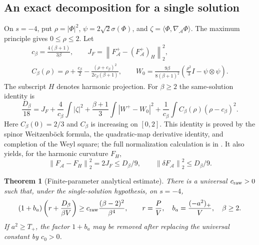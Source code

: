 \documentclass[11pt,a4paper]{article}
\newtheorem{theorem}{Theorem}[section]
\theoremstyle{definition}
\theoremstyle{remark}
\newcommand{\Acal}{\mathcal A}
\newcommand{\norm}[1]{\left\lVert#1\right\rVert}
\begin{document}
\subsection{An exact decomposition for a single solution}
On $s=-4$, put $\rho=|\Phi|^2$, $\psi=2\sqrt2\sigma(\Phi)$, and $\zeta=\langle\Phi,\nabla_{\Acal}\Phi\rangle$. The maximum principle gives $0\le\rho\le2$. Let
\begin{gather}
 c_\beta=\frac{4(\beta+1)}{3\beta},\qquad
 J_F=\norm{F^+_{\Acal}-(F^+_{\Acal})_H}_2^2,\nonumber\\
 C_\beta(\rho)=\rho+\frac{c_\beta}{2}
 -\frac{(\rho+c_\beta)^2}{2c_\beta(\beta+1)},\qquad
 W_0=\frac{9\beta}{8(\beta+1)^2}
       \left(\frac{\rho^2}{3}I-\psi\otimes\psi\right).
 \label{eq:calibration}
\end{gather}
The subscript $H$ denotes harmonic projection. For $\beta\ge2$ the same-solution identity is
\begin{equation}
 \frac{D_\beta}{18}=J_F+\frac4{c_\beta}\int|\zeta|^2
 +\frac{\beta+1}{3}\int|W^+-W_0|^2
 +\frac1{c_\beta}\int C_\beta(\rho)(\rho-c_\beta)^2.
 \label{eq:decomposition}
\end{equation}
Here $C_\beta(0)=2/3$ and $C_\beta$ is increasing on $[0,2]$. This identity is proved by the spinor Weitzenb\"ock formula, the quadratic-map derivative identity, and completion of the Weyl square; the full normalization calculation is in \cite[Section 2]{Parameter}. It also yields, for the harmonic curvature $F_H$,
\begin{equation}
 \norm{F_{\Acal}-F_H}_2^2=2J_F\le D_\beta/9,
 \qquad \norm{\delta F_{\Acal}}_2^2\le D_\beta/9.
 \label{eq:curvaturefit}
\end{equation}

\begin{theorem}[Finite-parameter analytical estimate]\label{thm:parameter}
There is a universal $c_{\rm raw}>0$ such that, under the single-solution hypothesis, on $s=-4$,
\begin{equation}
 (1+b_a)\left(r+\frac{D_\beta}{\beta V}\right)
 \ge c_{\rm raw}\frac{(\beta-2)^2}{\beta^4},\qquad
 r=\frac PV,\quad b_a=\frac{(-a^2)_+}{V},\quad\beta\ge2.
 \label{eq:parameter}
\end{equation}
If $a^2\ge T_+$, the factor $1+b_a$ may be removed after replacing the universal constant by $c_0>0$.
\end{theorem}
\end{document}
